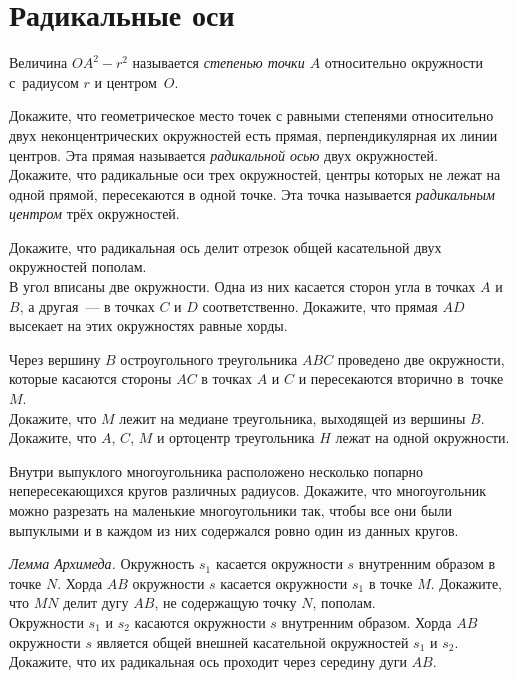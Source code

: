 
\section*{Радикальные оси}



Величина $OA^2 - r^2$ называется \emph{степенью точки $A$} относительно
окружности с~радиусом $r$ и центром~$O$.

\begin{problems}

\itemx{$^\circ$}
\sp
Докажите, что геометрическое место точек с равными степенями относительно двух
неконцентрических окружностей есть прямая, перпендикулярная их линии центров.
Эта прямая называется \emph{радикальной осью} двух окружностей.
\\
\sp
Докажите, что радикальные оси трех окружностей, центры которых не лежат на
одной прямой, пересекаются в одной точке.
Эта точка называется \emph{радикальным центром} трёх окружностей.

\item
\sp
Докажите, что радикальная ось делит отрезок общей касательной двух окружностей
пополам.
\\
\sp
В угол вписаны две окружности.
Одна из них касается сторон угла в точках $A$ и $B$, а другая~--- в точках $C$
и $D$ соответственно.
Докажите, что прямая $AD$ высекает на этих окружностях равные хорды.

\item
Через вершину $B$ остроугольного треугольника $ABC$ проведено две окружности,
которые касаются стороны $AC$ в точках $A$ и $C$ и пересекаются вторично
в~точке~$M$.
\\
\sp
Докажите, что $M$ лежит на медиане треугольника, выходящей из вершины $B$.
\\
\sp
Докажите, что $A$, $C$, $M$ и ортоцентр треугольника $H$ лежат на одной
окружности.

\item
Внутри выпуклого многоугольника расположено несколько попарно непересекающихся
кругов различных радиусов.
Докажите, что многоугольник можно разрезать на маленькие многоугольники так,
чтобы все они были выпуклыми и в каждом из них содержался ровно один из данных
кругов.

\item
\sp\emph{Лемма Архимеда.}
Окружность $s_1$ касается окружности $s$ внутренним образом в точке $N$.
Хорда $AB$ окружности $s$ касается окружности $s_1$ в точке $M$.
Докажите, что $MN$ делит дугу $AB$, не содержащую точку $N$, пополам.
\\
\sp
Окружности $s_1$ и $s_2$ касаются окружности $s$ внутренним образом.
Хорда $AB$ окружности $s$ является общей внешней касательной окружностей $s_1$
и $s_2$.
Докажите, что их радикальная ось проходит через середину дуги $AB$.


\end{problems}

